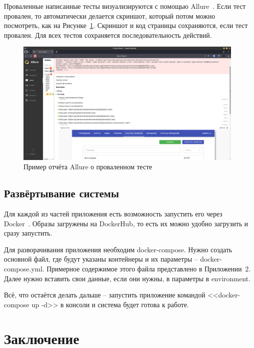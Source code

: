 \documentclass[a4paper,article]{article}
\begin{document}
\begin{sloppypar}
    Проваленные написанные тесты визуализируются с помощью Allure~\cite{allure}. Если тест провален, то автоматически делается скриншот, который потом можно посмотреть, как на Рисунке~\ref{fig:allure}. Скриншот и код страницы сохраняются, если тест провален. Для всех тестов сохраняется последовательность действий.
    
    \begin{figure}[h]
        \centering
        \includegraphics[width=0.8\linewidth]{UI. Отчёт Allure.png}        
        \caption{\centering Пример отчёта Allure о проваленном тесте}        
        \label{fig:allure}
    \end{figure}
    
    \newpage

    \subsection{Развёртывание системы}\label{Реализация. Сборка и развертывание}
    
    Для каждой из частей приложения есть возможность запустить его через Docker~\cite{dockerdoc}. Образы загружены на DockerHub, то есть их можно удобно загрузить и сразу запустить.
    
    Для разворачивания приложения необходим docker-compose. Нужно создать основной файл, где будут указаны контейнеры и их параметры -- docker-compose.yml. Примерное содержимое этого файла представлено в Приложении~2. Далее нужно вставить свои данные, если они нужны, в параметры в environment.
    
    Всё, что остаётся делать дальше -- запустить приложение командой <<docker-compose up -d>> в консоли и система будет готова к работе.

    \newpage

    \section*{Заключение}
    

\end{sloppypar}
\end{document}

